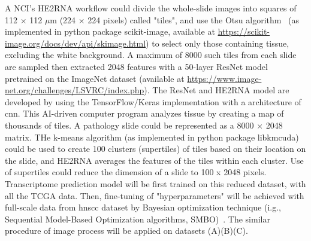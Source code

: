 \documentclass[12pt, a4paper]{article}
\begin{document}
A NCI's HE2RNA workflow could divide the whole-slide images into squares of 112 × 112 $\mu$m (224 × 224 pixels) called "tiles", and use the Otsu algorithm~\citep{Otsu1979} (as implemented in python package scikit-image, available at \url{https://scikit-image.org/docs/dev/api/skimage.html}) to select only those containing tissue, excluding the white background. 
A maximum of 8000 such tiles from each slide are sampled then extracted 2048 features with a 50-layer ResNet model~\citep{He2016a} pretrained on the ImageNet dataset (available at \url{https://www.image-net.org/challenges/LSVRC/index.php}).
The ResNet and HE2RNA model are developed by using the TensorFlow/Keras implementation with a architecture of \acrfull{cnn}.
This AI-driven computer program analyzes tissue by creating a map of thousands of tiles.
A pathology slide could be represented as a 8000 × 2048 matrix.
THe k-means algorithm (as implemented in python package libkmcuda) could be used to create 100 clusters (supertiles) of tiles based on their location on the slide, and HE2RNA averages the features of the tiles within each cluster. 
Use of supertiles could reduce the dimension of a slide to 100 x 2048 pixels.
Transcriptome prediction model will be first trained on this reduced dataset, with all the TCGA data. Then, fine-tuning of "hyperparameters" will be achieved with full-scale data from \acrshort{hnscc} dataset by Bayesian optimization technique (i.g., Sequential Model-Based Optimization algorithms, SMBO)~\citep{Hutter2011}.
The similar procedure of image process will be applied on datasets (A)(B)(C).\\[0.5cm]



\end{document}
